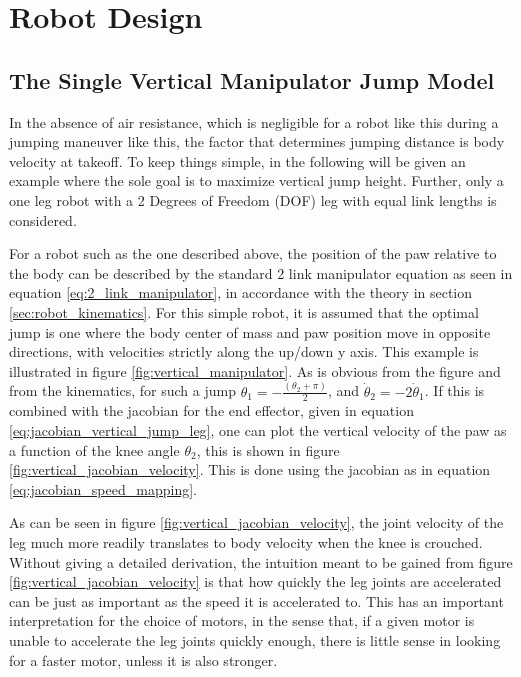 \section{Robot Design}
\label{sec:robot_design}

\subsection{The Single Vertical Manipulator Jump Model}

In the absence of air resistance, which is negligible for a robot like this during a jumping maneuver like this, the factor that determines jumping distance is body velocity at takeoff. To keep things simple, in the following will be given an example where the sole goal is to maximize vertical jump height. Further, only a one leg robot with a 2 Degrees of Freedom (DOF) leg with equal link lengths is considered. 

For a robot such as the one described above, the position of the paw relative to the body can be described by the standard 2 link manipulator equation as seen in equation \ref{eq:2_link_manipulator}, in accordance with the theory in section \ref{sec:robot_kinematics}. For this simple robot, it is assumed that the optimal jump is one where the body center of mass and paw position move in opposite directions, with velocities strictly along the up/down y axis. This example is illustrated in figure \ref{fig:vertical_manipulator}. As is obvious from the figure and from the kinematics, for such a jump $\theta_1 = -\frac{(\theta_2+\pi)}{2}$, and $\dot{\theta}_2=-2\dot{\theta}_1$. If this is combined with the jacobian for the end effector, given in equation \ref{eq:jacobian_vertical_jump_leg}, one can plot the vertical velocity of the paw as a function of the knee angle $\theta_2$, this is shown in figure \ref{fig:vertical_jacobian_velocity}. This is done using the jacobian as in equation \ref{eq:jacobian_speed_mapping}. 

As can be seen in figure \ref{fig:vertical_jacobian_velocity}, the joint velocity of the leg much more readily translates to body velocity when the knee is crouched. Without giving a detailed derivation, the intuition meant to be gained from figure \ref{fig:vertical_jacobian_velocity} is that how quickly the leg joints are accelerated can be just as important as the speed it is accelerated to. This has an important interpretation for the choice of motors, in the sense that, if a given motor is unable to accelerate the leg joints quickly enough, there is little sense in looking for a faster motor, unless it is also stronger. 

